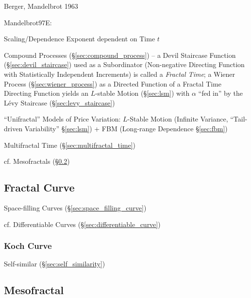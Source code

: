 Berger, Mandelbrot 1963

Mandelbrot97E:

Scaling/Dependence Exponent dependent on Time $t$

Compound Processes (\S\ref{sec:compound_process}) -- a Devil Staircase Function
(\S\ref{sec:devil_staircase}) used as a Subordinator (Non-negative Directing
Function with Statistically Independent Increments) is called a \emph{Fractal
  Time}; a Wiener Process (\S\ref{sec:wiener_process}) as a Directed Function of
a Fractal Time Directing Function yields an $L$-stable Motion (\S\ref{sec:lsm})
with $\alpha$ ``fed in'' by the L\'evy Staircase (\S\ref{sec:levy_staircase})

``Unifractal'' Models of Price Variation: $L$-Stable Motion
(Infinite Variance, ``Tail-driven Variability'' \S\ref{sec:lsm}) + FBM
(Long-range Dependence \S\ref{sec:fbm})

\fist Multifractal Time (\S\ref{sec:multifractal_time})

cf. Mesofractals (\S\ref{sec:mesofractal})



\subsection{Fractal Curve}\label{sec:fractal_curve}

Space-filling Curves (\S\ref{sec:space_filling_curve})

cf. Differentiable Curves (\S\ref{sec:differentiable_curve})



\subsubsection{Koch Curve}\label{sec:koch_curve}

Self-similar (\S\ref{sec:self_similarity})



\subsection{Mesofractal}\label{sec:mesofractal}

